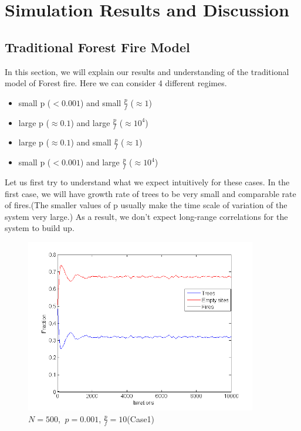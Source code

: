 \documentclass[11pt]{article}
\begin{document}
\section{Simulation Results and Discussion}
\subsection{Traditional Forest Fire Model}

In this section, we will explain our results and understanding of the traditional model of Forest fire. Here we can consider 4 different regimes. 
\begin{itemize}
\item small p ($< 0.001$) and small $\frac{p}{f}$ ($\approx 1$)
\item large p ($\approx 0.1$) and large $\frac{p}{f}$ ($\approx 10^4$)
\item large p ($\approx 0.1$) and small $\frac{p}{f}$ ($\approx 1$)
\item small p ($< 0.001$) and large $\frac{p}{f}$ ($\approx 10^4$)
\end{itemize}

Let us first try to understand what we expect intuitively for these cases. In the first case, we will have growth rate of trees to be very small and comparable rate of fires.(The smaller values of p usually make the time scale of variation of the system very large.) As a result, we don't expect long-range correlations for the system to build up.\\

\begin{figure}[H]
\centering
\includegraphics[width=0.9\textwidth,keepaspectratio=true,]{Pictures/case1_size_500.png}
\caption{$N=500$, $\ p=0.001$, $\frac{p}{f}=10$(Case1)}
\end{figure}
\end{document}
